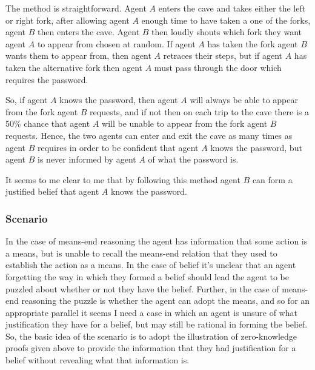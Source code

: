 \documentclass[10pt]{article}
\begin{document}
The method is straightforward.
Agent \(A\) enters the cave and takes either the left or right fork, after allowing agent \(A\) enough time to have taken a one of the forks, agent \(B\) then enters the cave.
Agent \(B\) then loudly shouts which fork they want agent \(A\) to appear from chosen at random.
If agent \(A\) has taken the fork agent \(B\) wants them to appear from, then agent \(A\) retraces their steps, but if agent \(A\) has taken the alternative fork then agent \(A\) must pass through the door which requires the password.

So, if agent \(A\) knows the password, then agent \(A\) will always be able to appear from the fork agent \(B\) requests, and if not then on each trip to the cave there is a 50\% chance that agent \(A\) will be unable to appear from the fork agent \(B\) requests.
Hence, the two agents can enter and exit the cave as many times as agent \(B\) requires in order to be confident that agent \(A\) knows the password, but agent \(B\) is never informed by agent \(A\) of what the password is.

It seems to me clear to me that by following this method agent \(B\) can form a justified belief that agent \(A\) knows the password.

\subsubsection{Scenario}
\label{sec:scenario-2}

In the case of means-end reasoning the agent has information that some action is a means, but is unable to recall the means-end relation that they used to establish the action as a means.
In the case of belief it's unclear that an agent forgetting the way in which they formed a belief should lead the agent to be puzzled about whether or not they have the belief.
Further, in the case of means-end reasoning the puzzle is whether the agent can adopt the means, and so for an appropriate parallel it seems I need a case in which an agent is unsure of what justification they have for a belief, but may still be rational in forming the belief.
So, the basic idea of the scenario is to adopt the illustration of zero-knowledge proofs given above to provide the information that they had justification for a belief without revealing what that information is.
\end{document}
